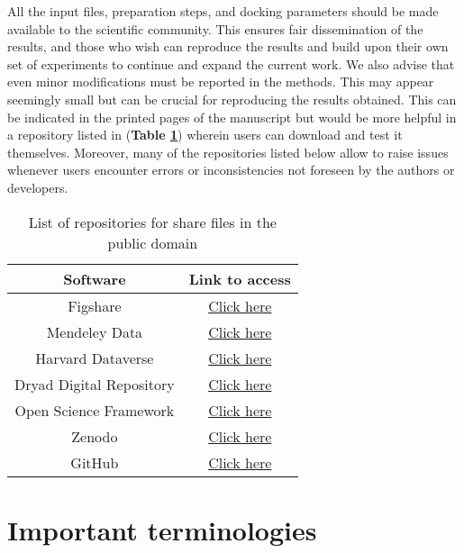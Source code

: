 \documentclass[10pt,letterpaper]{article}
\begin{document}
{{All the input files, preparation steps, and docking parameters should be made available to the scientific community. This ensures fair dissemination of the results, and those who wish can reproduce the results and build upon their own set of experiments to continue and expand the current work. We also advise that even minor modifications must be reported in the methods. This may appear seemingly small but can be crucial for reproducing the results obtained. This can be indicated in the printed pages of the manuscript but would be more helpful in a repository listed in (\textbf{Table \ref{tab:list3}}) wherein users can download and test it themselves. Moreover, many of the repositories listed below allow to raise issues whenever users encounter errors or inconsistencies not foreseen by the authors or developers. 

\begin{table}[ht]
    \centering 
    \caption{List of repositories for share files in the public domain}
    \label{tab:list3}
    \begin{tabular}{|c|c|}
    \hline
         \textbf{Software} & \textbf{Link to access} \\
    \hline
        Figshare &  \href{https://figshare.com/}{Click here} \\
        Mendeley Data &  \href{https://data.mendeley.com/}{Click here}  \\
        Harvard Dataverse &  \href{https://dataverse.harvard.edu/}{Click here}  \\
        Dryad Digital Repository & \href{https://datadryad.org/stash}{Click here} \\
        Open Science Framework &  \href{https://osf.io/}{Click here}  \\
        Zenodo & \href{https://zenodo.org/}{Click here} \\
        GitHub & \href{https://github.com/}{Click here} \\
    \hline
    \end{tabular}
\end{table}


\section*{Important terminologies}

}}
\end{document}
